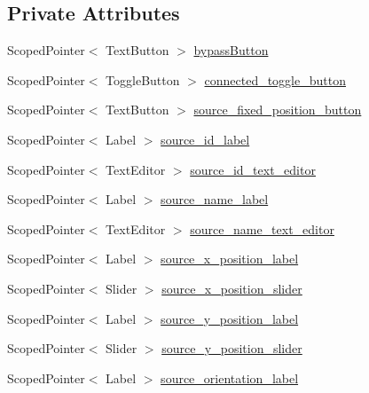 \subsection*{Private Attributes}
\begin{DoxyCompactItemize}
\item 
Scoped\-Pointer$<$ Text\-Button $>$ \hyperlink{classSSRSceneAutomationProcessorEditor_a04620ea403036ee702bac71bf3966120}{bypass\-Button}
\item 
Scoped\-Pointer$<$ Toggle\-Button $>$ \hyperlink{classSSRSceneAutomationProcessorEditor_adf8e333a8cbfccfc7c6b3a23403eb09f}{connected\-\_\-toggle\-\_\-button}
\item 
Scoped\-Pointer$<$ Text\-Button $>$ \hyperlink{classSSRSceneAutomationProcessorEditor_a8b2ad23c061cd82dd87ca2758dc590c5}{source\-\_\-fixed\-\_\-position\-\_\-button}
\item 
Scoped\-Pointer$<$ Label $>$ \hyperlink{classSSRSceneAutomationProcessorEditor_a70c13c66837e826b67097211d2b0da6c}{source\-\_\-id\-\_\-label}
\item 
Scoped\-Pointer$<$ Text\-Editor $>$ \hyperlink{classSSRSceneAutomationProcessorEditor_a67b94d27b5e48c55b8e64092fdbfcd92}{source\-\_\-id\-\_\-text\-\_\-editor}
\item 
Scoped\-Pointer$<$ Label $>$ \hyperlink{classSSRSceneAutomationProcessorEditor_a37c3865b4714e3bd2165afea5131368c}{source\-\_\-name\-\_\-label}
\item 
Scoped\-Pointer$<$ Text\-Editor $>$ \hyperlink{classSSRSceneAutomationProcessorEditor_aec0f1060346ef2a70a6c08d4cd970ee0}{source\-\_\-name\-\_\-text\-\_\-editor}
\item 
Scoped\-Pointer$<$ Label $>$ \hyperlink{classSSRSceneAutomationProcessorEditor_a31349521dc9c13bb9a91085c53415377}{source\-\_\-x\-\_\-position\-\_\-label}
\item 
Scoped\-Pointer$<$ Slider $>$ \hyperlink{classSSRSceneAutomationProcessorEditor_ab7c71c06346473482f60a13d64a77ff3}{source\-\_\-x\-\_\-position\-\_\-slider}
\item 
Scoped\-Pointer$<$ Label $>$ \hyperlink{classSSRSceneAutomationProcessorEditor_a421ad7fa49ee85d7466be0a318ae3409}{source\-\_\-y\-\_\-position\-\_\-label}
\item 
Scoped\-Pointer$<$ Slider $>$ \hyperlink{classSSRSceneAutomationProcessorEditor_a4dfea9893ab555673dc67b81a7721932}{source\-\_\-y\-\_\-position\-\_\-slider}
\item 
Scoped\-Pointer$<$ Label $>$ \hyperlink{classSSRSceneAutomationProcessorEditor_ac329e29cdd3a7386ad6122c77781709a}{source\-\_\-orientation\-\_\-label}

\end{DoxyCompactItemize}
